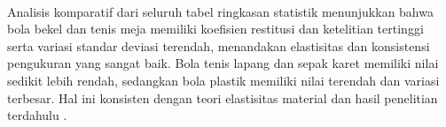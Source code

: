 \paragraph{}Analisis komparatif dari seluruh tabel ringkasan statistik menunjukkan bahwa bola bekel dan tenis meja memiliki koefisien restitusi dan ketelitian tertinggi serta variasi standar deviasi terendah, menandakan elastisitas dan konsistensi pengukuran yang sangat baik. Bola tenis lapang dan sepak karet memiliki nilai sedikit lebih rendah, sedangkan bola plastik memiliki nilai terendah dan variasi terbesar. Hal ini konsisten dengan teori elastisitas material dan hasil penelitian terdahulu \citep{meyer2020coefficient, smith2018experimental}.


